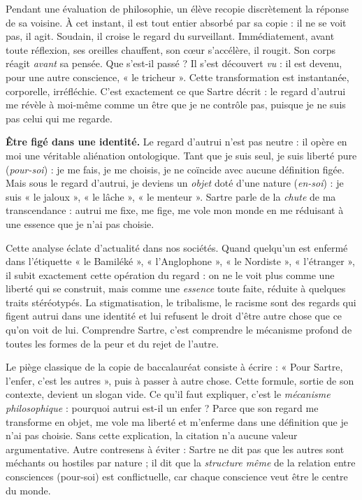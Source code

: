 \documentclass[11pt]{article}
\newcommand{\cle}[1]{{\popxbold\color{popdark}#1}}
\newcounter{popsec}
\newcounter{popsub}
\newcommand{\courssub}[1]{%
  \stepcounter{popsub}%
  \par\vspace{9pt}\noindent{\popxbold\fontsize{11.5}{13}\selectfont\color{popink}{\color{poporange}\thepopsec.\thepopsub}\hspace{6pt}#1}\par\nopagebreak\vspace{4pt}
}
\begin{document}
\begin{exemplebox}
Pendant une évaluation de philosophie, un élève recopie discrètement la réponse de sa voisine. À cet instant, il est tout entier absorbé par sa copie : il ne se voit pas, il agit. Soudain, il croise le regard du surveillant. Immédiatement, avant toute réflexion, ses oreilles chauffent, son cœur s'accélère, il rougit. Son corps réagit \emph{avant} sa pensée. Que s'est-il passé ? Il s'est découvert \emph{vu} : il est devenu, pour une autre conscience, « le tricheur ». Cette transformation est instantanée, corporelle, irréfléchie. C'est exactement ce que Sartre décrit : le regard d'autrui me révèle à moi-même comme un être que je ne contrôle pas, puisque je ne suis pas celui qui me regarde.
\end{exemplebox}

\courssub{Ce que le regard fait de moi : la métamorphose en objet}

\textbf{Être figé dans une identité.} Le regard d'autrui n'est pas neutre : il opère en moi une véritable aliénation ontologique. Tant que je suis seul, je suis \cle{liberté} pure (\emph{pour-soi}) : je me fais, je me choisis, je ne coïncide avec aucune définition figée. Mais sous le regard d'autrui, je deviens un \emph{objet} doté d'une nature (\emph{en-soi}) : je suis « le jaloux », « le lâche », « le menteur ». Sartre parle de la \emph{chute} de ma transcendance : autrui me fixe, me fige, me vole mon monde en me réduisant à une essence que je n'ai pas choisie.

Cette analyse éclate d'actualité dans nos sociétés. Quand quelqu'un est enfermé dans l'étiquette « le Bamiléké », « l'Anglophone », « le Nordiste », « l'étranger », il subit exactement cette opération du regard : on ne le voit plus comme une liberté qui se construit, mais comme une \emph{essence} toute faite, réduite à quelques traits stéréotypés. La stigmatisation, le tribalisme, le racisme sont des regards qui figent autrui dans une identité et lui refusent le droit d'être autre chose que ce qu'on voit de lui. Comprendre Sartre, c'est comprendre le mécanisme profond de toutes les formes de la peur et du rejet de l'autre.

\begin{attention}
Le piège classique de la copie de baccalauréat consiste à écrire : « Pour Sartre, l'enfer, c'est les autres », puis à passer à autre chose. Cette formule, sortie de son contexte, devient un slogan vide. Ce qu'il faut expliquer, c'est le \emph{mécanisme philosophique} : pourquoi autrui est-il un enfer ? Parce que son regard me transforme en objet, me vole ma liberté et m'enferme dans une définition que je n'ai pas choisie. Sans cette explication, la citation n'a aucune valeur argumentative. Autre contresens à éviter : Sartre ne dit pas que les autres sont méchants ou hostiles par nature ; il dit que la \emph{structure même} de la relation entre consciences (pour-soi) est conflictuelle, car chaque conscience veut être le centre du monde.
\end{attention}
\end{document}

